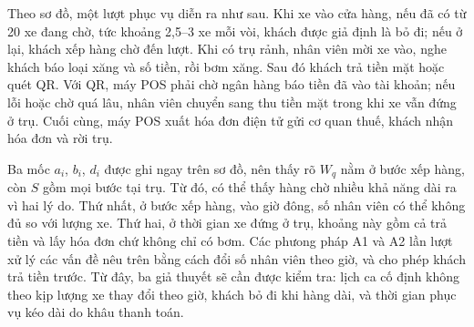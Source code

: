 Theo sơ đồ, một lượt phục vụ diễn ra như sau. Khi xe vào cửa hàng, nếu đã có từ 20 xe đang chờ, tức khoảng 2,5--3 xe mỗi vòi, khách được giả định là bỏ đi; nếu ở lại, khách xếp hàng chờ đến lượt. Khi có trụ rảnh, nhân viên mời xe vào, nghe khách báo loại xăng và số tiền, rồi bơm xăng. Sau đó khách trả tiền mặt hoặc quét QR. Với QR, máy POS phải chờ ngân hàng báo tiền đã vào tài khoản; nếu lỗi hoặc chờ quá lâu, nhân viên chuyển sang thu tiền mặt trong khi xe vẫn đứng ở trụ. Cuối cùng, máy POS xuất hóa đơn điện tử gửi cơ quan thuế, khách nhận hóa đơn và rời trụ.

Ba mốc $a_i$, $b_i$, $d_i$ được ghi ngay trên sơ đồ, nên thấy rõ $W_q$ nằm ở bước xếp hàng, còn $S$ gồm mọi bước tại trụ. Từ đó, có thể thấy hàng chờ nhiều khả năng dài ra vì hai lý do.
Thứ nhất, ở bước xếp hàng, vào giờ đông, số nhân viên có thể không đủ so với lượng xe. Thứ hai, ở thời gian xe đứng ở trụ, khoảng này gồm cả trả tiền và lấy hóa đơn chứ không chỉ có bơm. Các phưong pháp A1 và A2 lần lượt xử lý các vấn đề nêu trên bằng cách đổi số nhân viên theo giờ, và cho phép khách trả tiền trước. 
Từ đây, ba giả thuyết sẽ cần được kiểm tra: lịch ca cố định không theo kịp lượng xe thay đổi theo giờ, khách bỏ đi khi hàng dài, và thời gian phục vụ kéo dài do khâu thanh toán.
